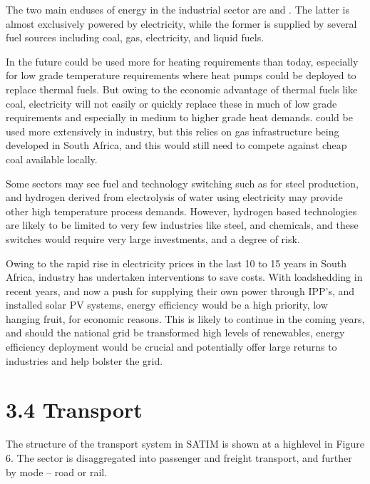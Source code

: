 \documentclass[letterpaper,10pt,english]{jupyterBook}
\begin{document}
\sphinxAtStartPar
The two main end\sphinxhyphen{}uses of energy in the industrial sector are  and . The latter is almost exclusively powered by electricity, while the former is supplied by several fuel sources including coal, gas, electricity, and liquid fuels.

\sphinxAtStartPar
In the future  could be used more for heating requirements than today, especially for low grade temperature requirements where heat pumps could be deployed to replace thermal fuels. But owing to the economic advantage of thermal fuels like coal, electricity will not easily or quickly replace these in much of low grade requirements and especially in medium to higher grade heat demands.   could be used more extensively in industry, but this relies on gas infrastructure being developed in South Africa, and this would still need to compete against cheap coal available locally.

\sphinxAtStartPar
Some sectors may see fuel and technology switching such as  for steel production, and hydrogen derived from electrolysis of water using electricity may provide other high temperature process demands. However, hydrogen based technologies are likely to be limited to very few industries like steel, and chemicals, and these switches would require very large investments, and a degree of risk.

\sphinxAtStartPar
Owing to the rapid rise in electricity prices in the last 10 to 15 years in South Africa, industry has undertaken  interventions to save costs. With loadshedding in recent years, and now a push for supplying their own power through IPP’s, and installed solar PV systems, energy efficiency would be a high priority, low hanging fruit, for economic reasons. This is likely to continue in the coming years, and should the national grid be transformed high levels of renewables, energy efficiency deployment would be crucial and potentially offer large returns to industries and help bolster the grid.


\section{3.4 Transport}
\label{\detokenize{03Energydemand:transport}}
\sphinxAtStartPar
The structure of the transport system in SATIM is shown at a high\sphinxhyphen{}level in Figure 6. The sector is disaggregated into passenger and freight transport, and further by mode – road or rail.
\end{document}
